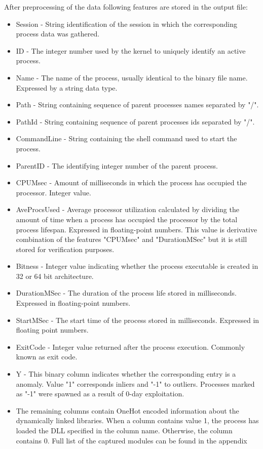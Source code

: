 \documentclass[a4paper,twoside,12pt]{book}
\begin{document}
After preprocessing of the data following features are stored in the output file:
\begin{itemize}
	\item Session - String identification of the session in which the corresponding process data 
	was gathered.
	\item ID -  The integer number used by the kernel to uniquely identify an active process.
	\item Name -  The name of the process, usually identical to the binary file name. Expressed by a 
	string data type.
	\item Path - String containing sequence of parent processes names separated by "/".
	\item PathId - String containing sequence of parent processes ids separated by "/".
	\item CommandLine - String containing the shell command used to start the process.
	\item ParentID - The identifying integer number of the parent process. 
	\item CPUMsec - Amount of milliseconds in which the process has occupied the processor. Integer value.
	\item AveProcsUsed -  Average processor utilization calculated by dividing the amount of time 
	when a process has occupied the processor by the total process lifespan. Expressed in floating-point 
	numbers. This value is derivative combination of the features "CPUMsec" and "DurationMSec"
	but it is still stored for verification purposes.
	\item Bitness - Integer value indicating whether the process executable is created in 
	32 or 64 bit architecture.
	\item DurationMSec - The duration of the process life stored in milliseconds. Expressed in 
	floating-point numbers.
	\item StartMSec -  The start time of the process stored in milliseconds. Expressed in floating 
	point numbers.
	\item ExitCode - Integer value returned after the process execution. Commonly known as exit code.
	\item Y - This binary column indicates whether the corresponding entry is a anomaly. Value "1" corresponds
	inliers and "-1" to outliers. Processes marked as "-1" were spawned as a result of 0-day exploitation.
	\item The remaining columns contain OneHot encoded information about the dynamically linked 
	libraries. When a column contains value 1, the process has loaded the DLL specified in the 
	column name. Otherwise, the column contains 0. Full list of the captured modules can be 
	found in the appendix %
\end{itemize}
\end{document}
